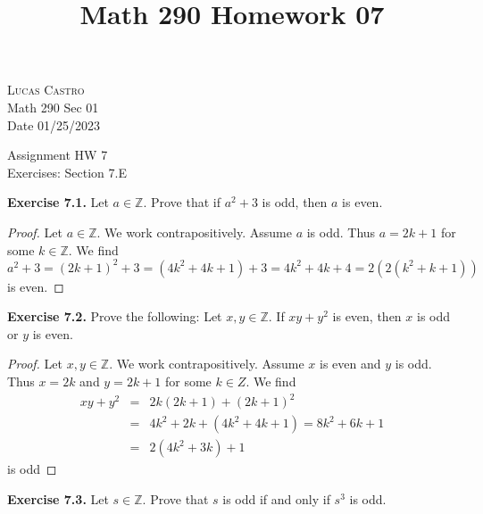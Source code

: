 \documentclass[12pt,oneside]{article}
\newenvironment{exercise}[1]{\vspace{.1in}\noindent\textbf{Exercise #1 \hspace{.05em}}}{}
\newcommand{\Z}{\mathbb{Z}}
\begin{document}
\title{Math 290 Homework 07}

\begin{flushright}
\textsc{Lucas Castro}  \\
Math 290 Sec 01\\
Date 01/25/2023
\end{flushright}

\begin{center}
\textsf{Assignment HW 7} \\
\textsf{Exercises: Section 7.E}
\end{center}


\begin{exercise}{7.1.}
Let $a \in \Z$. Prove that if $a^2 + 3$ is odd, then $a$ is even.
\end{exercise}

\begin{proof}
Let $a \in \Z$. We work contrapositively. Assume $a$ is odd. Thus $a = 2k + 1$ for some $k \in \Z$. We find
\[a^2 + 3 = (2k +  1)^2 + 3 = (4k^2 + 4k + 1) + 3 = 4k^2 + 4k + 4 = 2(2(k^2 + k + 1))\]
is even.
\end{proof}



\begin{exercise}{7.2.}
Prove the following: Let $x,y \in \Z$. If $xy+y^2$ is even, then $x$ is odd or $y$ is even.
\end{exercise}

\begin{proof}
Let $x,y \in \Z$. We work contrapositively. Assume $x$ is even and $y$ is odd. Thus $x = 2k$ and $y = 2k + 1$ for some $k \in Z$. We find
\begin{eqnarray*}
xy + y^2  &=& 2k(2k + 1) + (2k + 1)^2\\
&=& 4k^2 + 2k + (4k^2 + 4k + 1) = 8k^2 + 6k + 1\\ 
&=& 2(4k^2 + 3k) + 1 
\end{eqnarray*}
is odd
\end{proof}



\begin{exercise}{7.3.}
Let $s \in \Z$. Prove that $s$ is odd if and only if $s^3$ is odd.
\end{exercise}
\end{document}
